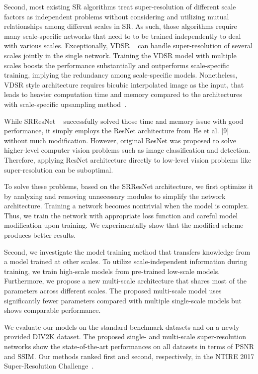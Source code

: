 \documentclass[10pt,twocolumn,letterpaper]{article}
\begin{document}
	Second, most existing SR algorithms treat super-resolution of different scale factors as independent problems without considering and utilizing mutual relationships among different scales in SR.
	As such, those algorithms require many scale-specific networks that need to to be trained independently to deal with various scales. 
	Exceptionally, VDSR ~\cite{kim2016accurate} can handle super-resolution of several scales jointly in the single network. Training the VDSR model with multiple scales boosts the performance substantially and outperforms scale-specific training, implying the redundancy among scale-specific models.
	Nonetheless, VDSR style architecture requires bicubic interpolated image as the input, that leads to heavier computation time and memory compared to the architectures with scale-specific upsampling method~\cite{dong2016accelerating,shi2016real,ledig2016photo}.
	
	While SRResNet ~\cite{ledig2016photo} successfully solved those time and memory issue with good performance, it simply employs the ResNet architecture from He et al. [9] without much modification. However, original ResNet was proposed to solve higher-level computer vision problems such as image classification and detection. Therefore, applying ResNet architecture directly to low-level vision problems like super-resolution can be suboptimal.
		
	To solve these problems, based on the SRResNet architecture, we first optimize it by analyzing and removing unnecessary modules to simplify the network architecture. Training a network becomes nontrivial when the model is complex. Thus, we train the network with appropriate loss function and careful model modification upon training. We experimentally show that the modified scheme produces better results. 
	
	Second, we investigate the model training method that transfers knowledge from a model trained at other scales. To utilize scale-independent information during training, we train high-scale models from pre-trained low-scale models. Furthermore, we propose a new multi-scale architecture that shares most of the parameters across different scales. The proposed multi-scale model uses significantly fewer parameters compared with multiple single-scale models but shows comparable performance.
	
	We evaluate our models on the standard benchmark datasets and on a newly provided DIV2K dataset. The proposed single- and multi-scale super-resolution networks show the state-of-the-art performances on all datasets in terms of PSNR and SSIM. Our methods ranked first and second, respectively, in the NTIRE 2017 Super-Resolution Challenge~\cite{Timofte_2017_CVPR_Workshops}.
	
\end{document}
